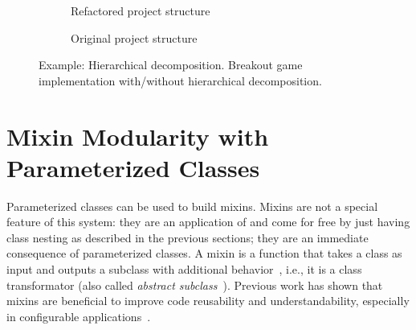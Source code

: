 \begin{figure}[!htp]
\begin{subfigure}[b]{0.45\textwidth}
\caption{Refactored project structure}
\end{subfigure}
\qquad
\begin{subfigure}[b]{0.45\textwidth}
\caption{Original project structure}
\end{subfigure}
\caption[Example: Hierarchical decomposition of Breakout]{Example: Hierarchical decomposition. Breakout game implementation with/without hierarchical decomposition.}
\label{fig:usecase_breakout_game}
\end{figure}


\section{Mixin Modularity with Parameterized Classes}
Parameterized classes can be used to build mixins. Mixins are not a special feature of this system: they are an application of \msname and come for free by just having class nesting as described in the previous sections; they are an immediate consequence of parameterized classes. A mixin is a function that takes a class as input and outputs a subclass with additional behavior~\cite{bracha1992programming, Bettini:2004:CCH:967900.968200, nestedinterfaces}, i.e., it is a class transformator (also called \emph{abstract subclass}~\cite{Bracha:1990:MI:97945.97982}). Previous work has shown that mixins are beneficial to improve code reusability and understandability, especially in configurable applications~\cite{Smaragdakis:2002:MLO:505145.505148, Cardone:2002:UMB:508386.508395, productlines-work}.

